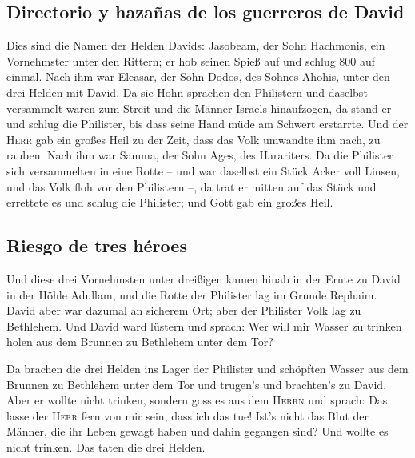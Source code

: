 \hypertarget{directorio-y-hazauxf1as-de-los-guerreros-de-david}{%
\subsection{Directorio y hazañas de los guerreros de
David}\label{directorio-y-hazauxf1as-de-los-guerreros-de-david}}

 Dies sind die Namen der Helden Davids: Jasobeam, der Sohn
Hachmonis, ein Vornehmster unter den Rittern; er hob seinen Spieß auf
und schlug 800 auf einmal.  Nach ihm war Eleasar, der Sohn
Dodos, des Sohnes Ahohis, unter den drei Helden mit David. Da sie Hohn
sprachen den Philistern und daselbst versammelt waren zum Streit und die
Männer Israels hinaufzogen,  da stand er und schlug die
Philister, bis dass seine Hand müde am Schwert erstarrte. Und der
\textsc{Herr} gab ein großes Heil zu der Zeit, dass das Volk umwandte
ihm nach, zu rauben.  Nach ihm war Samma, der Sohn Ages,
des Harariters. Da die Philister sich versammelten in eine Rotte -- und
war daselbst ein Stück Acker voll Linsen, und das Volk floh vor den
Philistern --,  da trat er mitten auf das Stück und
errettete es und schlug die Philister; und Gott gab ein großes Heil.

\hypertarget{riesgo-de-tres-huxe9roes}{%
\subsection{Riesgo de tres héroes}\label{riesgo-de-tres-huxe9roes}}

 Und diese drei Vornehmsten unter dreißigen kamen hinab
in der Ernte zu David in der Höhle Adullam, und die Rotte der Philister
lag im Grunde Rephaim.  David aber war dazumal an
sicherem Ort; aber der Philister Volk lag zu Bethlehem. 
Und David ward lüstern und sprach: Wer will mir Wasser zu trinken holen
aus dem Brunnen zu Bethlehem unter dem Tor?

 Da brachen die drei Helden ins Lager der Philister und
schöpften Wasser aus dem Brunnen zu Bethlehem unter dem Tor und trugen's
und brachten's zu David. Aber er wollte nicht trinken, sondern goss es
aus dem \textsc{Herrn}  und sprach: Das lasse der
\textsc{Herr} fern von mir sein, dass ich das tue! Ist's nicht das Blut
der Männer, die ihr Leben gewagt haben und dahin gegangen sind? Und
wollte es nicht trinken. Das taten die drei Helden.

